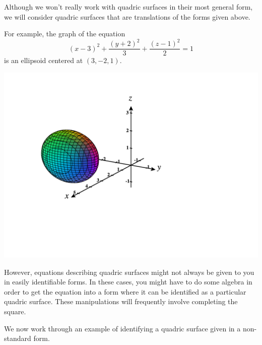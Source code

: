\documentclass{ximera}
\begin{document}
Although we won't really work with quadric surfaces in their most general form, we will consider quadric surfaces that are translations of the forms given above.

For example, the graph of the equation
\[
(x-3)^2 + \frac{(y+2)^2}{3} + \frac{(z-1)^2}{2} = 1
\]
is an ellipsoid centered at $(3,-2,1)$.

\begin{image}
\includegraphics[width = \textwidth]{CalcPlot3D-shifted_ellipse}
\end{image}

However, equations describing quadric surfaces might not always be given to you in easily identifiable forms. In these cases, you might have to do some algebra in order to get the equation into a form where it can be identified as a particular quadric surface. These manipulations will frequently involve completing the square.

We now work through an example of identifying a quadric surface given in a non-standard form.
\end{document}
